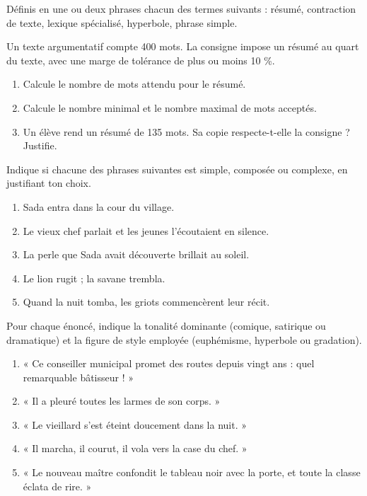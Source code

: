 \documentclass[11pt]{article}
\newcommand{\cle}[1]{{\popxbold\color{popdark}#1}}
\newcounter{popsec}
\newcounter{popsub}
\newcommand{\courssub}[1]{%
  \stepcounter{popsub}%
  \par\vspace{9pt}\noindent{\popxbold\fontsize{11.5}{13}\selectfont\color{popink}{\color{poporange}\thepopsec.\thepopsub}\hspace{6pt}#1}\par\nopagebreak\vspace{4pt}
}
\begin{document}
\begin{exercice}[Définitions]
Définis en une ou deux phrases chacun des termes suivants : \cle{résumé}, \cle{contraction de texte}, \cle{lexique spécialisé}, \cle{hyperbole}, \cle{phrase simple}.
\end{exercice}

\begin{exercice}
Un texte argumentatif compte 400 mots. La consigne impose un résumé au quart du texte, avec une marge de tolérance de plus ou moins 10 \%.
\begin{enumerate}
\item Calcule le nombre de mots attendu pour le résumé.
\item Calcule le nombre minimal et le nombre maximal de mots acceptés.
\item Un élève rend un résumé de 135 mots. Sa copie respecte-t-elle la consigne ? Justifie.
\end{enumerate}
\end{exercice}

\courssub{Je m'entraîne}

\begin{exercice}
Indique si chacune des phrases suivantes est simple, composée ou complexe, en justifiant ton choix.
\begin{enumerate}
\item Sada entra dans la cour du village.
\item Le vieux chef parlait et les jeunes l'écoutaient en silence.
\item La perle que Sada avait découverte brillait au soleil.
\item Le lion rugit ; la savane trembla.
\item Quand la nuit tomba, les griots commencèrent leur récit.
\end{enumerate}
\end{exercice}

\begin{exercice}
Pour chaque énoncé, indique la tonalité dominante (comique, satirique ou dramatique) et la figure de style employée (euphémisme, hyperbole ou gradation).
\begin{enumerate}
\item « Ce conseiller municipal promet des routes depuis vingt ans : quel remarquable bâtisseur ! »
\item « Il a pleuré toutes les larmes de son corps. »
\item « Le vieillard s'est éteint doucement dans la nuit. »
\item « Il marcha, il courut, il vola vers la case du chef. »
\item « Le nouveau maître confondit le tableau noir avec la porte, et toute la classe éclata de rire. »
\end{enumerate}
\end{exercice}
\end{document}
